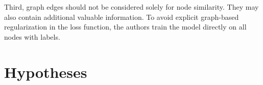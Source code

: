 \documentclass[11pt,a4paper]{article}
\begin{document}

Third, graph edges should not be considered solely for node similarity. They may also contain additional valuable information. To avoid explicit graph-based regularization in the loss function, the authors train the model directly on all nodes with labels.










\section{Hypotheses}
\end{document}

